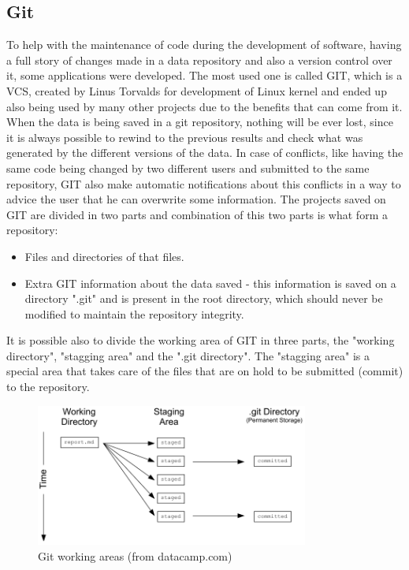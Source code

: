 \documentclass[mim_thesis.tex]{subfiles}
\begin{document}
\subsection{Git}
To help with the maintenance of code during the development of software, having a full story of changes made in a data repository and also a version control over it, some applications were developed. The most used one is called GIT, which is a \ac{VCS}, created by Linus Torvalds for development of Linux kernel and ended up also being used by many other projects due to the benefits that can come from it. When the data is being saved in a git repository, nothing will be ever lost, since it is always possible to rewind to the previous results and check what was generated by the different versions of the data. In case of conflicts, like having the same code being changed by two different users and submitted to the same repository, GIT also make automatic notifications about this conflicts in a way to advice the user that he can overwrite some information. The projects saved on GIT are divided in two parts and combination of this two parts is what form a repository:

\begin{itemize} [noitemsep]
\item Files and directories of that files.
\item Extra GIT information about the data saved - this information is saved on a directory ".git" and is present in the root directory, which should never be modified to maintain the repository integrity.
\end{itemize}

It is possible also to divide the working area of GIT in three parts, the "working directory", "stagging area" and the ".git directory". The "stagging area" is a special area that takes care of the files that are on hold to be submitted (commit) to the repository.

\begin{figure}[H]
	\centering
    \includegraphics[width=0.8\textwidth]{img/git_areas.PNG}
	\caption{Git working areas (from datacamp.com)}
	\label{fig:git_areas}
\end{figure}
\end{document}
